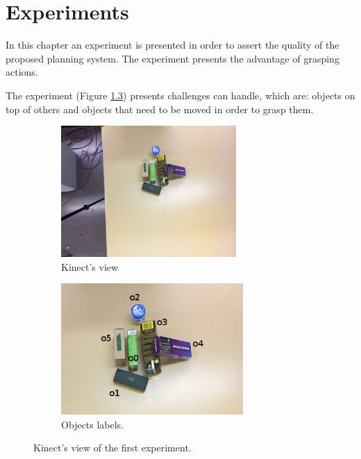\chapter{Experiments}
\label{ch:experiments}

In this chapter an experiment is presented in order to assert the quality of the proposed planning system. The experiment presents the advantage of  grasping actions. 

The experiment (Figure \ref{fig:experiment_good}) presents  challenges  can handle, which are: objects on top of others and objects that need to be moved in order to grasp them. 
\begin{figure}[tb]
\centering
\begin{subfigure}[t]{0.45\textwidth}
\centering
\includegraphics[height=5cm]{Img/experiments/image.png}
\caption{Kinect's view}\label{fig:experiment_good1}
\end{subfigure}
\begin{subfigure}[t]{0.45\textwidth}
\centering
\includegraphics[height=5cm]{Img/experiments/image_labels.png}
\caption{Objects labels.}\label{fig:experiment_good2}
\end{subfigure}
\caption{Kinect's view of the first experiment.}\label{fig:experiment_good}
\end{figure}


